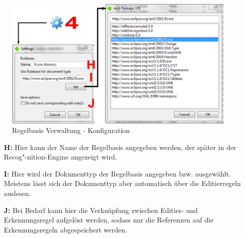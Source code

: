 \begin{figure}[htb]
  \centering \includegraphics[scale=0.6]{images/rulebase_config_dia.png}
  \caption{Regelbasis Verwaltung - Konfiguration}
  \label{fig:rulbase_gui_config}
\end{figure}

\begin{itemize}
  \item[\textbf{H:}] Hier kann der Name der Regelbasis angegeben werden, der später in der
  Recog"-nition-Engine angezeigt wird.
  \item[\textbf{I:}] Hier wird der Dokumenttyp der Regelbasis angegeben bzw. ausgewählt. Meistens
  lässt sich der Dokumenttyp aber automatisch über die Editierregeln auslesen.
  \item[\textbf{J:}] Bei Bedarf kann hier die Verknüpfung zwischen Editier- und Erkennungsregel
  aufgelöst werden, sodass nur die Referenzen auf die Erkennungsregeln abgespeichert werden.
\end{itemize}

